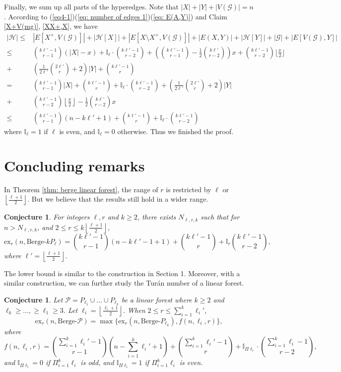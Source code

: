 \documentclass[12pt]{article}%
\def\QEDopen{{\hfill\setlength{\fboxsep}{0pt}\setlength{\fboxrule}{0.2pt}\fbox{\rule[0pt]{0pt}{1.3ex}\rule[0pt]{1.3ex}{0pt}}}}
\newtheorem{conjecture}[theorem]{Conjecture}
\newcommand{\ber}{\text{Berge-}}
\newcommand{\mh}{\mathcal{H}}
\newcommand{\mg}{\mathcal{G}}
\newcommand{\lf}{\left\lfloor}
\newcommand{\rf}{\right\rfloor}
\begin{document}
Finally, we sum up all parts of the hyperedges.
Note that $|X|+|Y|+|V(\mg)|=n$. According to (\ref{eq4-1})(\ref{eq: number of edges 1})(\ref{eq: E(A,Y)}) and Claim \ref{X+V(mg)}, \ref{XX+,X}, we have
\begin{equation*}
    \begin{aligned}
        |\mh|\leq& |E[X^+,V(\mg)]|+|\mh[X]|+|E[X\setminus X^+,V(\mg)]|+|E(X,Y)|+|\mh[Y]|+|\mg|+|E[V(\mg),Y]|\\
        \leq &\binom{k\ell'-1}{r-1}(|X|-x)+\mathbb{I}_\ell\cdot\binom{k\ell'-1}{r-2}+\left(\binom{k\ell'-1}{r-1}-\frac{1}{2}\binom{k\ell'}{r-2}\right)x+\binom{k\ell'-1}{r-2}\lfloor\frac{x}{2}\rfloor\\
        +& \left(\frac{1}{2\ell'}\binom{2\ell'}{r}+2 \right)|Y|+\binom{k\ell'-1}{r}\\
        = & \binom{k\ell'-1}{r-1}|X|+\binom{k\ell'-1}{r}+\mathbb{I}_\ell\cdot\binom{k\ell'-1}{r-2}+\left(\frac{1}{2\ell'}\binom{2\ell'}{r}+2 \right)|Y|\\
        +& \binom{k\ell'-1}{r-2}\left\lfloor\frac{x}{2}\right\rfloor-\frac{1}{2}\binom{k\ell'}{r-2}x\\
        \leq & \binom{k\ell'-1}{r-1}(n-k\ell'+1)+\binom{k\ell'-1}{r}+\mathbb{I}_\ell\cdot\binom{k\ell'-1}{r-2}
    \end{aligned}
\end{equation*}
 where $\mathbb{I}_\ell=1$ if $\ell$ is even, and $\mathbb{I}_\ell=0$ otherwise.
Thus we finished the proof.
\QEDopen
\fi
\section{Concluding remarks}
In Theorem \ref{thm: berge linear forest},
the range of $r$ is restricted by $\ell$ or $\lf \frac{\ell+1}{2}\rf$. But we believe that the results still hold in a wider range.
\begin{conjecture}
    For integers $\ell,r$ and $k\geq 2$, there exists $N_{\ell,r,k}$ such that for $n>N_{\ell,r,k}$, and $2\leq r\leq k\lf\frac{\ell+1}{2}\rf$,
    $$\mathrm{ex}_r(n,\ber kP_\ell)=\binom{k\ell'-1}{r-1}(n-k\ell'-1+1)+\binom{k\ell'-1}{r}+\mathbb{I}_r\binom{k\ell'-1}{r-2},$$
    where $\ell'=\lf\frac{\ell+1}{2}\rf.$
\end{conjecture}
The lower bound is similar to the construction in Section 1. Moreover, with a similar construction, we can further study the Tur\'an number of a linear forest.
\begin{conjecture}
    Let $\mathcal{P}=P_{\ell_1}\cup\dots\cup P_{\ell_k}$ be a linear forest where $k\geq 2$ and $\ell_k\geq \dots,\geq \ell_1\geq 3$. Let $\ell_i=\lf\frac{\ell_i+1}{2}\rf$. When $2\leq r\leq \sum_{i=1}^k\ell_i'$,
    $$\mathrm{ex}_r(n,\ber\mathcal{P})=\max\{\mathrm{ex}_r(n,\ber P_{\ell_k}),f(n,\ell_i,r)\},$$
    where
    $$f(n,\ell_i,r)=\binom{\sum_{i=1}^k\ell_i'-1}{r-1}(n-\sum_{i=1}^k\ell_i'+1)+\binom{\sum_{i=1}^k\ell_i'-1}{r}+\mathbb{I}_{\Pi\ell_i}\cdot\binom{\sum_{i=1}^k\ell_i-1}{r-2},$$
    and $\mathbb{I}_{\Pi\ell_i}=0$ if $\Pi_{i=1}^k\ell_i$ is odd, and  $\mathbb{I}_{\Pi\ell_i}=1$ if $\Pi_{i=1}^k\ell_i$ is even.
\end{conjecture}
\end{document}
